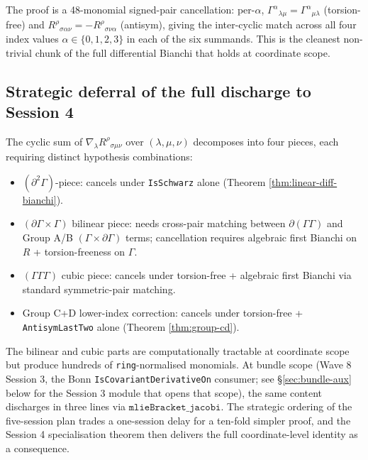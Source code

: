 \documentclass[twocolumn]{revtex4-2}
\newcommand{\Christoffel}{\Gamma}
\begin{document}
The proof is a 48-monomial signed-pair cancellation: per-$\alpha$,
$\Christoffel^{\alpha}{}_{\lambda\mu} = \Christoffel^{\alpha}{}_{\mu\lambda}$
(torsion-free) and $R^{\rho}{}_{\sigma\alpha\nu}
= -R^{\rho}{}_{\sigma\nu\alpha}$ (antisym), giving the
inter-cyclic match across all four index values $\alpha \in \{0,1,2,3\}$
in each of the six summands. This is the cleanest non-trivial chunk of
the full differential Bianchi that holds at coordinate scope.

\subsection{Strategic deferral of the full discharge to Session 4}
\label{sec:deferral}
The cyclic sum of $\nabla_{\lambda} R^{\rho}{}_{\sigma\mu\nu}$ over
$(\lambda, \mu, \nu)$ decomposes into four pieces, each requiring
distinct hypothesis combinations:

\begin{itemize}
\item $(\partial^{2}\Christoffel)$-piece: cancels under \texttt{IsSchwarz}
  alone (Theorem \ref{thm:linear-diff-bianchi}).
\item $(\partial \Christoffel \times \Christoffel)$ bilinear piece:
  needs cross-pair matching between $\partial(\Christoffel\Christoffel)$
  and Group A/B $(\Christoffel \times \partial\Christoffel)$ terms;
  cancellation requires algebraic first Bianchi on $R$ + torsion-freeness
  on $\Christoffel$.
\item $(\Christoffel\Christoffel\Christoffel)$ cubic piece: cancels
  under torsion-free + algebraic first Bianchi via standard
  symmetric-pair matching.
\item Group C+D lower-index correction: cancels under torsion-free +
  \texttt{AntisymLastTwo} alone (Theorem \ref{thm:group-cd}).
\end{itemize}

The bilinear and cubic parts are computationally tractable at coordinate
scope but produce hundreds of \texttt{ring}-normalised monomials. At
bundle scope (Wave 8 Session 3, the Bonn
\texttt{IsCovariantDerivativeOn} consumer; see \S\ref{sec:bundle-aux}
below for the Session 3 module that opens that scope), the same content
discharges in three lines via $\texttt{mlieBracket\_jacobi}$. The
strategic ordering of the five-session plan trades a one-session delay
for a ten-fold simpler proof, and the Session 4 specialisation theorem
then delivers the full coordinate-level identity as a consequence.
\end{document}
